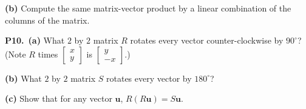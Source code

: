\documentclass[12pt]{amsart}
\newcommand{\bu}{\bm{u}}
\newcommand{\prob}[1]{\bigskip\noindent\textbf{#1}\quad }
\newcommand{\epart}[1]{\medskip\noindent\textbf{(#1)}\quad }
\newcommand{\ppart}[1]{\,\textbf{(#1)}\quad }
\begin{document}
\epart{b}  Compute the same matrix-vector product by a linear combination of the columns of the matrix.

\prob{P10.}  \ppart{a} What $2$ by $2$ matrix $R$ rotates every vector counter-clockwise by $90^\circ$?  (Note $R$ times $\begin{bmatrix} x \\ y \end{bmatrix}$ is $\begin{bmatrix} y \\ -x \end{bmatrix}$.)

\epart{b} What $2$ by $2$ matrix $S$ rotates every vector by $180^\circ$?

\epart{c} Show that for any vector $\bu$, $R(R\bu) = S\bu$.
\end{document}
